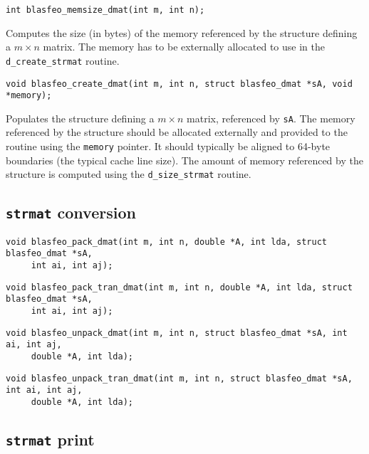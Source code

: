 \documentclass[a4paper]{report}
\begin{document}
\begin{verbatim}
int blasfeo_memsize_dmat(int m, int n);
\end{verbatim}
Computes the size (in bytes) of the memory referenced by the structure defining a $m\times n$ matrix.
The memory has to be externally allocated to use in the {\tt d\_create\_strmat} routine.

\begin{verbatim}
void blasfeo_create_dmat(int m, int n, struct blasfeo_dmat *sA, void *memory);
\end{verbatim}
Populates the structure defining a $m\times n$ matrix, referenced by {\tt sA}.
The memory referenced by the structure should be allocated externally and provided to the routine using the {\tt memory} pointer.
It should typically be aligned to 64-byte boundaries (the typical cache line size).
The amount of memory referenced by the structure is computed using the {\tt d\_size\_strmat} routine.



\subsection{{\tt strmat} conversion}

\begin{verbatim}
void blasfeo_pack_dmat(int m, int n, double *A, int lda, struct blasfeo_dmat *sA, 
     int ai, int aj);
\end{verbatim}

\begin{verbatim}
void blasfeo_pack_tran_dmat(int m, int n, double *A, int lda, struct blasfeo_dmat *sA, 
     int ai, int aj);
\end{verbatim}

\begin{verbatim}
void blasfeo_unpack_dmat(int m, int n, struct blasfeo_dmat *sA, int ai, int aj, 
     double *A, int lda);
\end{verbatim}

\begin{verbatim}
void blasfeo_unpack_tran_dmat(int m, int n, struct blasfeo_dmat *sA, int ai, int aj, 
     double *A, int lda);
\end{verbatim}



\subsection{{\tt strmat} print}
\end{document}
